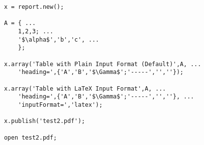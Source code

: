  \begin{verbatim}
 x = report.new();
 
 A = { ...
     1,2,3; ...
     '$\alpha$','b','c', ...
     };
 
 x.array('Table with Plain Input Format (Default)',A, ...
     'heading=',{'A','B','$\Gamma$';'-----','',''});
 
 x.array('Table with LaTeX Input Format',A, ...
     'heading=',{'A','B','$\Gamma$';'-----','',''}, ...
     'inputFormat=','latex');
 
 x.publish('test2.pdf');
 
 open test2.pdf;
 \end{verbatim}



